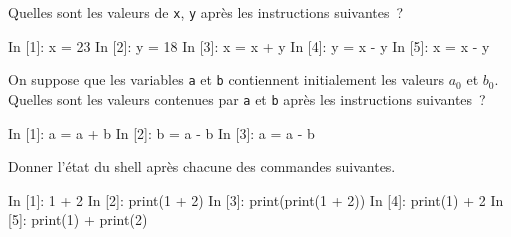 \documentclass{magnolia}
\begin{document}
Quelles sont les valeurs de \verb!x!, \verb!y! après les instructions suivantes~?
\begin{pythoncode}
In [1]: x = 23
In [2]: y = 18
In [3]: x = x + y 
In [4]: y = x - y 
In [5]: x = x - y 
\end{pythoncode}

On suppose que les variables \verb_a_ et \verb_b_ contiennent initialement les valeurs
$a_0$ et $b_0$. Quelles sont les valeurs contenues par \verb_a_ et \verb_b_ après les
instructions suivantes~?
\begin{pythoncode}
In [1]: a = a + b
In [2]: b = a - b
In [3]: a = a - b
\end{pythoncode}



Donner l'état du shell après chacune des commandes suivantes.
\begin{pythoncode}
In [1]: 1 + 2
In [2]: print(1 + 2)
In [3]: print(print(1 + 2))
In [4]: print(1) + 2
In [5]: print(1) + print(2)
\end{pythoncode}





\end{document}
